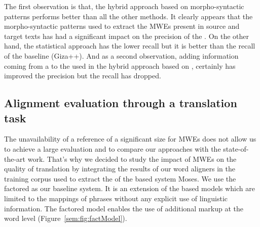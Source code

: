 \documentclass[output=paper,modfonts,nonflat]{langsci/langscibook}
\begin{document}
The first observation is that, the hybrid approach based on morpho-syntactic patterns performs better than all the other methods. It clearly appears that the morpho-syntactic patterns used to extract the MWEs present in source and target texts has had a significant impact on the precision of the . On the other hand, the statistical approach has the lower recall but it is better than the recall of the baseline (Giza++). And as a second observation, adding information coming from a  to the  used in the hybrid approach based on , certainly has improved the precision but the recall has dropped.

\subsection{Alignment evaluation through a translation task}\label{sec:semmar:5.2}

The unavailability of a reference  of a significant size for MWEs does not allow us to achieve a large evaluation and to compare our approaches with the state-of-the-art work. That's why we decided to study the impact of MWEs on the quality of translation by integrating the results of our word aligners in the training corpus used to extract the  of the  based  system Moses. We use the factored  \citep{koehn2007factored} as our baseline system. It is an extension of the  based models which are limited to the mappings of phrases without any explicit use of linguistic information.  The factored model enables the use of additional markup at the word level (Figure~\ref{sem:fig:factModel}).
\end{document}
